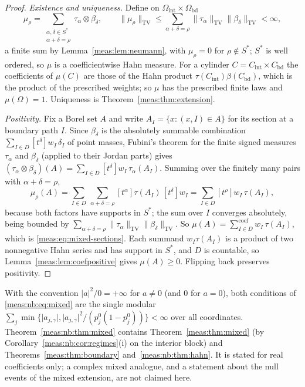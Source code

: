 \documentclass[11pt]{article}
\numberwithin{equation}{section}
\theoremstyle{definition}
\theoremstyle{remark}
\newcommand{\TV}{\mathrm{TV}}
\newcommand{\coef}[2]{[t^{#1}]#2}
\newcommand{\csum}{\mathop{\sum}\nolimits^{\mathrm{coef}}}
\newcommand{\norm}[1]{\lVert#1\rVert}
\newcommand{\abs}[1]{\lvert#1\rvert}
\begin{document}
\begin{proof}
\emph{Existence and uniqueness.} Define on $\Omega_{\mathrm{int}}\times\Omega_{\mathrm{bd}}$
\[
 \mu_\rho=\sum_{\substack{\alpha,\delta\in S^*\\\alpha+\delta=\rho}}\tau_\alpha\otimes\beta_\delta,
 \qquad
 \norm{\mu_\rho}_\TV\le\sum_{\alpha+\delta=\rho}\norm{\tau_\alpha}_\TV\norm{\beta_\delta}_\TV<\infty,
\]
a finite sum by Lemma~\ref{meas:lem:neumann}, with $\mu_\rho=0$ for $\rho\notin S^*$;
$S^*$ is well ordered, so $\mu$ is a coefficientwise Hahn measure. For a cylinder
$C=C_{\mathrm{int}}\times C_{\mathrm{bd}}$ the coefficients of $\mu(C)$ are those of the
Hahn product $\tau(C_{\mathrm{int}})\beta(C_{\mathrm{bd}})$, which is the product of the
prescribed weights; so $\mu$ has the prescribed finite laws and $\mu(\Omega)=1$.
Uniqueness is Theorem~\ref{meas:thm:extension}.

\emph{Positivity.} Fix a Borel set $A$ and write $A_I=\{x:(x,I)\in A\}$ for its
section at a boundary path $I$. Since $\beta_\delta$ is the absolutely summable
combination $\sum_{I\in D}\coef\delta{w_I}\,\delta_I$ of point masses, Fubini's theorem
for the finite signed measures $\tau_\alpha$ and $\beta_\delta$ (applied to their Jordan
parts) gives $(\tau_\alpha\otimes\beta_\delta)(A)=\sum_{I\in D}\coef\delta{w_I}\,\tau_\alpha(A_I)$.
Summing over the finitely many pairs with $\alpha+\delta=\rho$,
\[
 \mu_\rho(A)=\sum_{I\in D}\ \sum_{\alpha+\delta=\rho}\coef\alpha{\tau(A_I)}\,\coef\delta{w_I}
 =\sum_{I\in D}\coef\rho{w_I\,\tau(A_I)},
\]
because both factors have supports in $S^*$; the sum over $I$ converges absolutely,
being bounded by $\sum_{\alpha+\delta=\rho}\norm{\tau_\alpha}_\TV\norm{\beta_\delta}_\TV$. So
$\mu(A)=\csum_{I\in D}w_I\,\tau(A_I)$, which is \eqref{meas:eq:mixed-sections}. Each
summand $w_I\tau(A_I)$ is a product of two nonnegative Hahn series and has support in
$S^*$, and $D$ is countable, so Lemma~\ref{meas:lem:coefpositive} gives
$\mu(A)\ge0$. Flipping back preserves positivity.
\end{proof}

With the convention $\abs a^2/0=+\infty$ for $a\ne0$ (and $0$ for $a=0$), both
conditions of \eqref{meas:nb:eq:mixed} are the single modular
$\sum_j\min\{\abs{a_{j,\gamma}},\abs{a_{j,\gamma}}^2/(p_j^0(1-p_j^0))\}<\infty$ over all
coordinates. Theorem~\ref{meas:nb:thm:mixed} contains Theorem~\ref{meas:thm:mixed}
(by Corollary~\ref{meas:nb:cor:regimes}(i) on the interior block) and
Theorems~\ref{meas:thm:boundary} and~\ref{meas:nb:thm:hahn}. It is stated for real
coefficients only; a complex mixed analogue, and a statement about the null
events of the mixed extension, are not claimed here.
\end{document}
